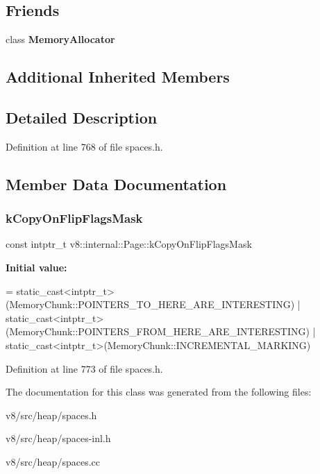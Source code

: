 \subsection*{Friends}
\begin{DoxyCompactItemize}
\item 
\mbox{\label{classv8_1_1internal_1_1Page_aea1126d5a764b0d074d2d6edb5a09f23}} 
class {\bfseries Memory\+Allocator}
\end{DoxyCompactItemize}
\subsection*{Additional Inherited Members}


\subsection{Detailed Description}


Definition at line 768 of file spaces.\+h.



\subsection{Member Data Documentation}
\mbox{\label{classv8_1_1internal_1_1Page_a90064db403deda38844f31a9b86fab6c}} 
\subsubsection{\texorpdfstring{k\+Copy\+On\+Flip\+Flags\+Mask}{kCopyOnFlipFlagsMask}}
{\footnotesize\ttfamily const intptr\+\_\+t v8\+::internal\+::\+Page\+::k\+Copy\+On\+Flip\+Flags\+Mask\hspace{0.3cm}{\ttfamily [static]}}

{\bfseries Initial value\+:}
\begin{DoxyCode}
=
      \textcolor{keyword}{static\_cast<}intptr\_t\textcolor{keyword}{>}(MemoryChunk::POINTERS\_TO\_HERE\_ARE\_INTERESTING) |
      static\_cast<intptr\_t>(MemoryChunk::POINTERS\_FROM\_HERE\_ARE\_INTERESTING) |
      \textcolor{keyword}{static\_cast<}intptr\_t\textcolor{keyword}{>}(MemoryChunk::INCREMENTAL\_MARKING)
\end{DoxyCode}


Definition at line 773 of file spaces.\+h.



The documentation for this class was generated from the following files\+:\begin{DoxyCompactItemize}
\item 
v8/src/heap/spaces.\+h\item 
v8/src/heap/spaces-\/inl.\+h\item 
v8/src/heap/spaces.\+cc\end{DoxyCompactItemize}

